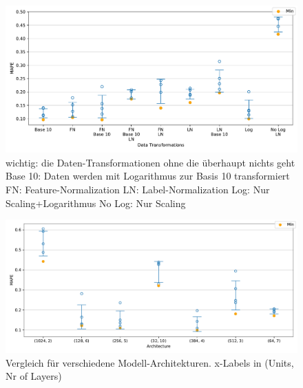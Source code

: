 \begin{figure}[tbp]
	\centering
	\includegraphics[width=14cm]{graphics/17,18}
	\caption{wichtig: die Daten-Transformationen ohne die überhaupt nichts geht \newline
			Base 10: Daten werden mit Logarithmus zur Basis 10 transformiert \newline
			FN: Feature-Normalization \newline
			LN: Label-Normalization \newline
			Log: Nur Scaling+Logarithmus \newline 
			No Log: Nur Scaling}
\end{figure}
\begin{figure}[tbp]
	\centering
	\includegraphics[width=14cm]{graphics/33}
	\caption{Vergleich für verschiedene Modell-Architekturen. \newline
		x-Labels in (Units, Nr of Layers)}
\end{figure}
